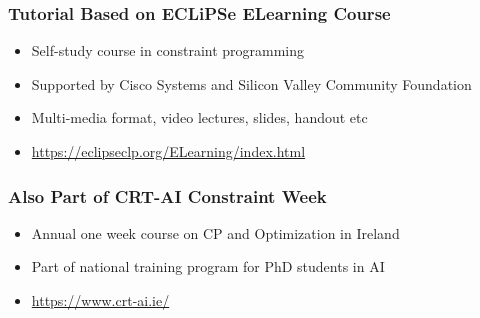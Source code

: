 
\begin{frame}
\frametitle{Tutorial Based on ECLiPSe ELearning Course}
\begin{itemize}
\item Self-study course in constraint programming
\item Supported by Cisco Systems and Silicon Valley Community Foundation
\item Multi-media format, video lectures, slides, handout etc
\item {\small \url{https://eclipseclp.org/ELearning/index.html}}
\end{itemize}
\end{frame}

\begin{frame}
\frametitle{Also Part of CRT-AI Constraint Week}
\begin{itemize}
\item Annual one week course on CP and Optimization in Ireland
\item Part of national training program for PhD students in AI
\item \url{https://www.crt-ai.ie/}
\end{itemize}
\end{frame}



